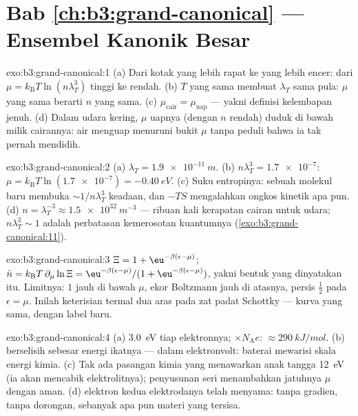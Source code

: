\section*{Bab \ref{ch:b3:grand-canonical} --- Ensembel Kanonik Besar}

\begin{solution}{exo:b3:grand-canonical:1}
(a) Dari kotak yang lebih rapat ke yang lebih encer: dari $\mu =
k_{\text{B}}T\ln(n\lambda_T^3)$ tinggi ke rendah. (b) $T$ yang sama
membuat $\lambda_T$ sama pula: $\mu$ yang sama berarti $n$ yang sama. (c)
$\mu_{\text{cair}} = \mu_{\text{uap}}$ --- yakni definisi
kelembapan jenuh. (d) Dalam udara kering, $\mu$ uapnya (dengan $n$ rendah)
duduk di bawah milik cairannya: air menguap menuruni bukit $\mu$
tanpa peduli bahwa ia tak pernah mendidih.
\end{solution}

\begin{solution}{exo:b3:grand-canonical:2}
(a) $\lambda_T = \qty{1.9e-11}{m}$. (b) $n\lambda_T^3 =
\num{1.7e-7}$: $\mu = k_{\text{B}}T\ln(\num{1.7e-7}) =
\qty{-0.40}{eV}$. (c) Suku entropinya: sebuah molekul baru membuka
$\sim1/n\lambda_T^3$ keadaan, dan $-TS$ mengalahkan ongkos kinetik apa pun.
(d) $n = \lambda_T^{-3} \approx \qty{1.5e32}{m^{-3}}$ --- ribuan kali
kerapatan cairan untuk udara; $n\lambda_T^3 \sim 1$
adalah perbatasan kemerosotan kuantumnya
(\cref{exo:b3:grand-canonical:11}).
\end{solution}

\begin{solution}{exo:b3:grand-canonical:3}
$\Xi = 1 + \eu^{-\beta(\epsilon-\mu)}$; $\bar n = k_{\text{B}}T\,
\partial_\mu\ln\Xi = \eu^{-\beta(\epsilon-\mu)}/(1 +
\eu^{-\beta(\epsilon-\mu)})$, yakni bentuk yang dinyatakan itu. Limitnya: $1$ jauh
di bawah $\mu$, ekor Boltzmann jauh di atasnya, persis $\tfrac12$ pada
$\epsilon = \mu$. Inilah keterisian termal dua aras pada
zat padat Schottky --- kurva yang sama, dengan label baru.
\end{solution}

\begin{solution}{exo:b3:grand-canonical:4}
(a) \qty{3.0}{eV} tiap elektronnya; $\times N_{\text{A}}e$:
$\approx\qty{290}{kJ/mol}$. (b)  berselisih sebesar
energi ikatnya --- dalam elektronvolt: baterai mewarisi skala energi
kimia. (c) Tak ada pasangan kimia yang menawarkan anak tangga
\qty{12}{eV} (ia akan mencabik elektrolitnya); penyusunan seri
menambahkan jatuhnya $\mu$ dengan aman. (d)  elektron
kedua elektrodanya telah menyama: tanpa gradien, tanpa dorongan,
sebanyak apa pun materi yang tersisa.
\end{solution}

